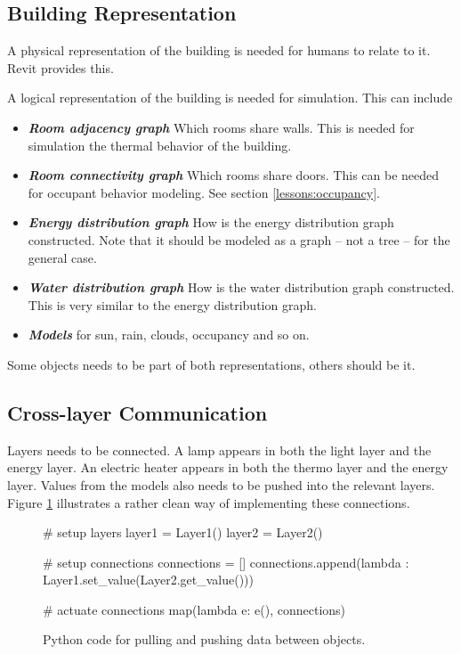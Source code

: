 \documentclass[10pt]{article}
\newcommand{\textdesc}[1]{\textit{\textbf{#1}}} %
\newcommand{\descitem}[1]{\item \textdesc{#1}}
\begin{document}
\subsection{Building Representation}

A physical representation of the building is needed for humans to relate to it. Revit provides this.

A logical representation of the building is needed for simulation. This can include
\begin{itemize}
  \descitem{Room adjacency graph} Which rooms share walls. This is needed for simulation the thermal behavior of the building.
  \descitem{Room connectivity graph} Which rooms share doors. This can be needed for occupant behavior modeling. See section \ref{lessons:occupancy}.
  \descitem{Energy distribution graph} How is the energy distribution graph constructed. Note that it should be modeled as a graph -- not a tree -- for the general case.
  \descitem{Water distribution graph} How is the water distribution graph constructed. This is very similar to the energy distribution graph.
  \descitem{Models} for sun, rain, clouds, occupancy and so on.
\end{itemize}

Some objects needs to be part of both representations, others should be it.

\subsection{Cross-layer Communication}

Layers needs to be connected. A lamp appears in both the light layer and the energy layer. An electric heater appears in both the thermo layer and the energy layer. Values from the models also needs to be pushed into the relevant layers. Figure \ref{fig:lessons:xlayer} illustrates a rather clean way of implementing these connections.

\begin{figure}[htb]
  \begin{center}
\begin{python}
# setup layers
layer1 = Layer1()
layer2 = Layer2()

# setup connections
connections = []
connections.append(lambda : Layer1.set_value(Layer2.get_value()))

# actuate connections
map(lambda e: e(), connections)
\end{python}
  \end{center}
  \caption{Python code for pulling and pushing data between objects.}
  \label{fig:lessons:xlayer}
\end{figure}
\end{document}
